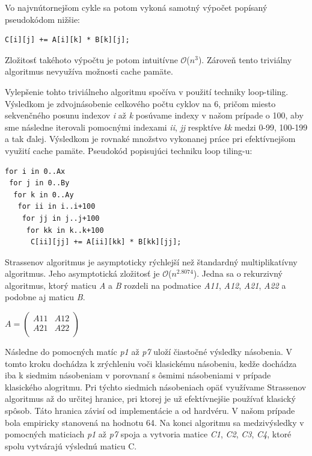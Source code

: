 \documentclass[slovak]{article}
\begin{document}
Vo najvnútornejšom cykle sa potom vykoná samotný výpočet popísaný pseudokódom nižšie:

\begin{verbatim}
C[i][j] += A[i][k] * B[k][j];
\end{verbatim}

Zložitosť takéhoto výpočtu je potom intuitívne $\mathcal{O}$($n^3$). Zároveň tento triviálny algoritmus nevyužíva možnosti cache pamäte.

Vylepšenie tohto triviálneho algoritmu spočíva v použití techniky loop-tiling. Výsledkom je zdvojnásobenie celkového počtu cyklov na 6, pričom miesto sekvenčného posunu indexov \emph{i} až \emph{k} posúvame indexy v našom prípade o 100, aby sme následne iterovali pomocnými indexami \emph{ii}, \emph{jj} respktíve \emph{kk} medzi 0-99, 100-199 a tak ďalej. Výsledkom je rovnaké množstvo vykonanej práce pri efektívnejšom využití cache pamäte. Pseudokód popisujúci techniku loop tiling-u:

\begin{verbatim}
for i in 0..Ax
 for j in 0..By
  for k in 0..Ay
   for ii in i..i+100 
    for jj in j..j+100
     for kk in k..k+100
      C[ii][jj] += A[ii][kk] * B[kk][jj];
\end{verbatim}

Strassenov algoritmus je asymptoticky rýchlejší než štandardný multiplikatívny algoritmus. Jeho asymptotická zložitosť je $\mathcal{O}$($n^{2.8074}$). Jedna sa o rekurzivný algoritmus, ktorý maticu \emph{A} a \emph{B} rozdeli na podmatice \emph{A11}, \emph{A12}, \emph{A21}, \emph{A22} a podobne aj maticu \emph{B}. 

$A =
 \begin{pmatrix}
  A11 & A12 \\
  A21 & A22 \\
 \end{pmatrix}
$ 

Následne do pomocných matíc \emph{p1} až \emph{p7} uloží čiastočné výsledky násobenia. V tomto kroku dochádza k zrýchleniu voči klasickému násobeniu, kedže dochádza iba k siedmim násobeniam v porovnaní s ôsmimi násobeniami v prípade klasického alogritmu. Pri týchto siedmich násobeniach opäť využívame Strassenov algoritmus až do určitej hranice, pri ktorej je už efektívnejšie používať klasický spôsob. Táto hranica závisí od implementácie a od hardvéru. V našom prípade bola empiricky stanovená na hodnotu 64. Na konci algoritmu sa medzivýsledky v pomocných maticiach \emph{p1} až \emph{p7} spoja a vytvoria matice \emph{C1}, \emph{C2}, \emph{C3}, \emph{C4}, ktoré spolu vytvárajú výslednú maticu C.
\end{document}
